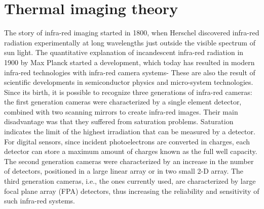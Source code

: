 \section{Thermal imaging theory}
\label{sec:theory}
The story of infra-red imaging started in 1800, when Herschel discovered 
infra-red radiation experimentally at long wavelengths just outside the visible 
spectrum of sun light.
The quantitative explanation of incandescent infra-red radiation in 1900 by Max 
Planck started a development, which today has resulted in modern infra-red 
technologies with infra-red camera systems- These are also the result of 
scientific developments in semiconductor physics and micro-system 
technologies.\cite{10.1117/12.2266142}\\
Since its birth, it is possible to recognize three generations of infra-red 
cameras\cite{thermalimage}: the first generation cameras were characterized by 
a single element detector, combined with two scanning mirrors to create 
infra-red images. 
Their main disadvantage was that they suffered from saturation problems. 
Saturation indicates the limit of the highest irradiation that can be measured 
by a detector. For digital sensors, since incident photoelectrons are converted 
in charges, each detector can store a maximum amount of charges known as the 
full well capacity.\cite{10.1117/12.2266142}\\
The second generation cameras were characterized by an increase in the number 
of detectors, positioned in a large linear array or in two small 2-D array.
The third generation cameras, i.e., the ones currently used, are characterized 
by large focal plane array (FPA) detectors, thus increasing the reliability 
and sensitivity of such infra-red systems.\cite{rogalski2000infrared} 
%
